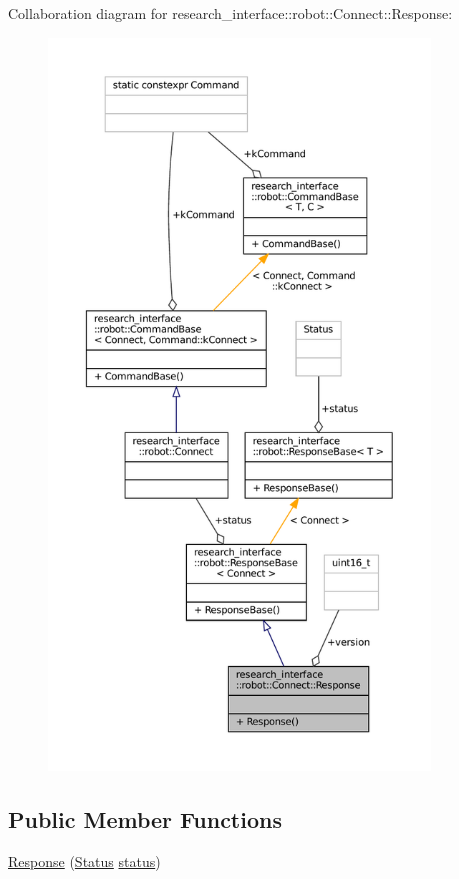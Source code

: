 Collaboration diagram for research\+\_\+interface\+:\+:robot\+:\+:Connect\+:\+:Response\+:
\nopagebreak
\begin{figure}[H]
\begin{center}
\leavevmode
\includegraphics[height=550pt]{structresearch__interface_1_1robot_1_1Connect_1_1Response__coll__graph}
\end{center}
\end{figure}
\subsection*{Public Member Functions}
\begin{DoxyCompactItemize}
\item 
\hyperlink{structresearch__interface_1_1robot_1_1Connect_1_1Response_a35f6044fae8722636842ca463ca108e5}{Response} (\hyperlink{structresearch__interface_1_1robot_1_1Connect_acd25a9893ac3b26eeb1eb776173c7e69}{Status} \hyperlink{structresearch__interface_1_1robot_1_1ResponseBase_a99bb821172a0ac77338cd8e0acbe8a96}{status})
\end{DoxyCompactItemize}

